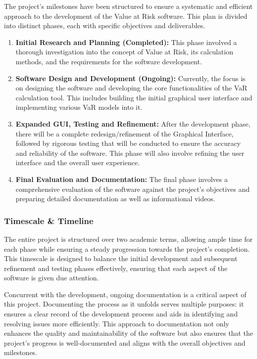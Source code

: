 \documentclass{article}
\begin{document}
\newpage
The project's milestones have been structured to ensure a systematic and efficient approach to the development of the Value at Risk software. This plan is divided into distinct phases, each with specific objectives and deliverables.

  \begin{enumerate}
    \item \textbf{Initial Research and Planning (Completed):} This phase involved a thorough investigation into the concept of Value at Risk, its calculation methods, and the requirements for the software development.
    \item \textbf{Software Design and Development (Ongoing):} Currently, the focus is on designing the software and developing the core functionalities of the VaR calculation tool. This includes building the initial graphical user interface and implementing various VaR models into it.
    \item \textbf{Expanded GUI, Testing and Refinement:} After the development phase, there will be a complete redesign/refinement of the Graphical Interface, followed by rigorous testing that will be conducted to ensure the accuracy and reliability of the software. This phase will also involve refining the user interface and the overall user experience.
    \item \textbf{Final Evaluation and Documentation:} The final phase involves a comprehensive evaluation of the software against the project's objectives and preparing detailed documentation as well as informational videos.
  \end{enumerate}

  \subsubsection{Timescale \& Timeline}
  The entire project is structured over two academic terms, allowing ample time for each phase while ensuring a steady progression towards the project's completion. This timescale is designed to balance the initial development and subsequent refinement and testing phases effectively, ensuring that each aspect of the software is given due attention.\\\vspace{0.3cm}

  Concurrent with the development, ongoing documentation is a critical aspect of this project. Documenting the process as it unfolds serves multiple purposes: it ensures a clear record of the development process and aids in identifying and resolving issues more efficiently. This approach to documentation not only enhances the quality and maintainability of the software but also ensures that the project's progress is well-documented and aligns with the overall objectives and milestones.
\end{document}
